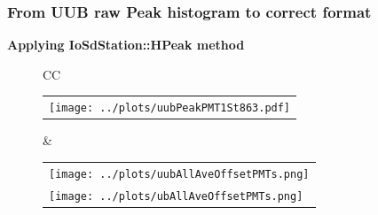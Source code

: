 \documentclass[aspectratio=169]{beamer}
\begin{document}
\begin{frame}
	\frametitle{From UUB raw Peak histogram to correct format}
	{\bf Applying IoSdStation::HPeak method}
	\begin{figure}
		\centering
		\begin{tabularx}{\textwidth}{CC}
			\\ 
      \begin{tabular}{l}
				\texttt{[image: ../plots/uubPeakPMT1St863.pdf]}
			\end{tabular}
      &
      \begin{tabular}{l}
        \texttt{[image: ../plots/uubAllAveOffsetPMTs.png]}
        \\
        \texttt{[image: ../plots/ubAllAveOffsetPMTs.png]}
      \end{tabular}
		\end{tabularx}
	\end{figure}
\end{frame}





\end{document}

